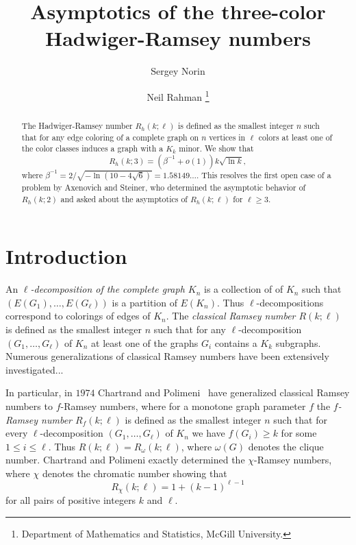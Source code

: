 \documentclass{article}
\title{Asymptotics of the three-color Hadwiger-Ramsey numbers}
\author{ Sergey Norin		\and Neil Rahman \thanks{Department of Mathematics and Statistics, McGill University.}
	}
\newcommand{\s}[1]{\left(#1\right)}
\newcommand{\defn}[1]{\textcolor{definitionred}{\emph{#1}}}
\begin{document}
	\maketitle
	
	\begin{abstract}
		The Hadwiger-Ramsey number $R_h(k;\ell)$ is defined as the smallest integer $n$ such that for any edge coloring of a complete graph on $n$ vertices in $\ell$ colors at least one of the color classes induces a graph with a $K_k$ minor. We  show that $$R_h(k;3) = \s{\beta^{-1} + o(1)}k \sqrt{\ln k},$$
		where $\beta^{-1} = 2/\sqrt{-\ln(10-4\sqrt6)} = 1.58149\ldots$. 
		This resolves the first open case of a problem by Axenovich and Steiner, who determined the asymptotic behavior of $R_h(k;2)$ and asked about the asymptotics of $R_h(k;\ell)$ for $\ell \geq 3$.
		\end{abstract}
	
\section{Introduction}

An \defn{$\ell$-decomposition of the complete graph $K_n$} is a collection of of $K_n$ such that $(E(G_1),\ldots,E(G_\ell))$ is a partition of $E(K_n)$. Thus $\ell$-decompositions correspond to colorings of edges of $K_n$.
The \defn{classical Ramsey number $R(k;\ell)$} is defined as the smallest integer $n$ such that for any $\ell$-decomposition $(G_1,\ldots,G_\ell)$ of $K_n$ at least one of the graphs  $G_i$ contains a $K_k$ subgraphs. Numerous generalizations of classical Ramsey numbers have been extensively investigated...

In particular, in $1974$ Chartrand and Polimeni~\cite{} have generalized classical Ramsey numbers to  $f$-Ramsey numbers, where for a monotone graph parameter $f$ the \defn{$f$-Ramsey number $R_f(k;\ell)$} is defined as the smallest integer $n$ such that for every $\ell$-decomposition $(G_1,\ldots,G_\ell)$ of $K_n$ we have $f(G_i) \geq k$ for some $1 \leq i \leq \ell$.  Thus $R(k;\ell)=R_{\omega}(k;\ell)$, where $\omega(G)$ denotes the clique number. Chartrand and Polimeni exactly determined the $\chi$-Ramsey numbers, where $\chi$ denotes the chromatic number showing that $$R_{\chi}(k;\ell)=1+(k-1)^{\ell-1}$$ for all pairs of positive integers $k$ and $\ell$.
\end{document}
